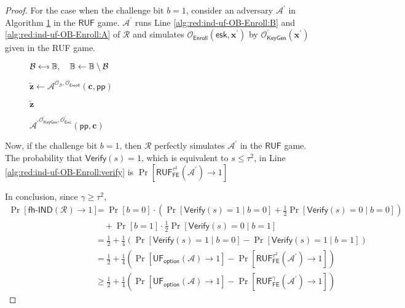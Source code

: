 \begin{proof}
	For the case when the challenge bit $b = 1$, consider an adversary $\mathcal{A}^\prime$ in Algorithm \ref{alg:adv:ind-uf-OB-Enroll} in the $\textsf{RUF}$ game. $\mathcal{A}^\prime$ runs Line \ref{alg:red:ind-uf-OB-Enroll:B} and \ref{alg:red:ind-uf-OB-Enroll:A} of $\mathcal{R}$ and simulates $\mathcal{O}_{\textsf{Enroll}}( \textsf{esk}, \mathbf{x}^\prime )$ by $\mathcal{O}_\textsf{KeyGen}^\prime(\mathbf{x}^\prime)$ given in the \textsf{RUF} game. 


\begin{figure}[h]
\centering

	\begin{minipage}[t]{0.45\textwidth}
	\begin{algorithm}[H]
	\caption{${\mathcal{A}^\prime}^{\mathcal{O}^\prime_{\textsf{KeyGen}}, \mathcal{O}^\prime_{\textsf{Enc}} }(\textsf{pp}, \mathbf{c})$}
	\label{alg:adv:ind-uf-OB-Enroll}
	\begin{algorithmic}[1]
		\State $\mathcal{B} \getsdollar \mathbb{B}, \quad \mathbb{B} \gets \mathbb{B} \setminus \mathcal{B}$ 
		
		\State $\mathbf{\tilde{z}} \gets {\mathcal{A}}^{\mathcal{O}_{\mathcal{B}}, \mathcal{O}_\textsf{Enroll} } (\mathbf{c}, \textsf{pp})$

		\State \Return $\mathbf{\tilde{z}}$
	\end{algorithmic}
	\end{algorithm}
	\end{minipage}

\end{figure}

Now, if the challenge bit $b = 1$, then $\mathcal{R}$ perfectly simulates $\mathcal{A}^\prime$ in the $\textsf{RUF}$ game. The probability that $\textsf{Verify}(s) = 1$, which is equivalent to $s \leq \tau^2$, in Line \ref{alg:red:ind-uf-OB-Enroll:verify} is $\Pr[\textsf{RUF}^{\tau^2}_{\textsf{FE}}(\mathcal{A}^\prime) \to 1 ]$

In conclusion, since $\gamma \geq \tau^2$,
\begin{align*}
	\Pr[\textsf{fh-IND}(\mathcal{R}) \to 1] 
	&= \Pr[b = 0] \cdot \left( \Pr[\textsf{Verify}(s) = 1 \mid b = 0] + \frac{1}{2} \Pr[\textsf{Verify}(s) = 0 \mid b = 0] \right) \\
	&\quad + \Pr[b = 1] \cdot \frac{1}{2} \Pr[\textsf{Verify}(s) = 0 \mid b = 1] \\
	&= \frac{1}{2} + \frac{1}{4} \left( \Pr[\textsf{Verify}(s) = 1 \mid b = 0] - \Pr[\textsf{Verify}(s) = 1 \mid b = 1] \right) \\
	&= \frac{1}{2} + \frac{1}{4} \left( \Pr[\textsf{UF}_{\textsf{option}}(\mathcal{A}) \to 1] - \Pr[\textsf{RUF}^{\tau^2}_{\textsf{FE}}(\mathcal{A}^\prime) \to 1 ] \right) \\
	&\geq \frac{1}{2} + \frac{1}{4} \left( \Pr[\textsf{UF}_\textsf{option}(\mathcal{A}) \to 1] - \Pr[\textsf{RUF}^{\gamma}_{\textsf{FE}}(\mathcal{A}^\prime) \to 1 ] \right)
\end{align*}


\end{proof}
